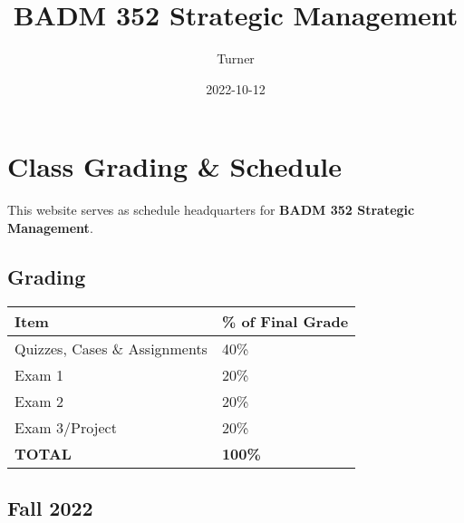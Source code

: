 \documentclass[
]{book}
\title{BADM 352 Strategic Management}
\author{Turner}
\date{2022-10-12}
\begin{document}
\maketitle

{
\setcounter{tocdepth}{1}
\tableofcontents
}
\hypertarget{class-grading-schedule}{%
\chapter*{Class Grading \& Schedule}\label{class-grading-schedule}}

This website serves as schedule headquarters for \textbf{BADM 352 Strategic Management}.

\hypertarget{grading}{%
\section*{Grading}\label{grading}}

\begin{longtable}[]{@{}ll@{}}
\toprule
Item & \% of Final Grade \\
\midrule
\endhead
Quizzes, Cases \& Assignments & 40\% \\
Exam 1 & 20\% \\
Exam 2 & 20\% \\
Exam 3/Project & 20\% \\
\textbf{TOTAL} & \textbf{100\%} \\
\bottomrule
\end{longtable}

\hypertarget{fall-2022}{%
\section*{Fall 2022}\label{fall-2022}}
\end{document}
